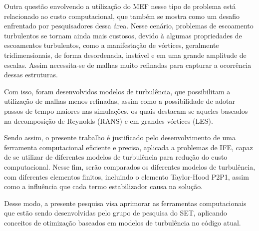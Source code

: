 Outra questão envolvendo a utilização do MEF nesse tipo de problema está relacionado ao custo computacional, que também se mostra como um desafio enfrentado por pesquisadores dessa área. Nesse cenário, problemas de escoamento turbulentos se tornam ainda mais custosos, devido à algumas propriedades de escoamentos turbulentos, como a manifestação de vórtices, geralmente tridimensionais, de forma desordenada, instável e em uma grande amplitude de escalas. Assim necessita-se de malhas muito refinadas para capturar a ocorrência dessas estruturas.

Com isso, foram desenvolvidos modelos de turbulência, que possibilitam a utilização de malhas menos refinadas, assim como a possibilidade de adotar passos de tempo maiores nas simulações, os quais destacam-se aqueles baseados na decomposição de Reynolds (RANS) e em grandes vórtices (LES).

Sendo assim, o presente trabalho é justificado pelo desenvolvimento de uma ferramenta computacional eficiente e precisa, aplicada a problemas de IFE, capaz de se utilizar de diferentes modelos de turbulência para redução do custo computacional. Nesse fim, serão comparados os diferentes modelos de turbulência, com diferentes elementos finitos, incluindo o elemento Taylor-Hood P2P1, assim como a influência que cada termo estabilizador causa na solução.

Desse modo, a presente pesquisa visa aprimorar as ferramentas computacionais que estão sendo desenvolvidas pelo grupo de pesquisa do SET, aplicando conceitos de otimização baseados em modelos de turbulência no código atual.